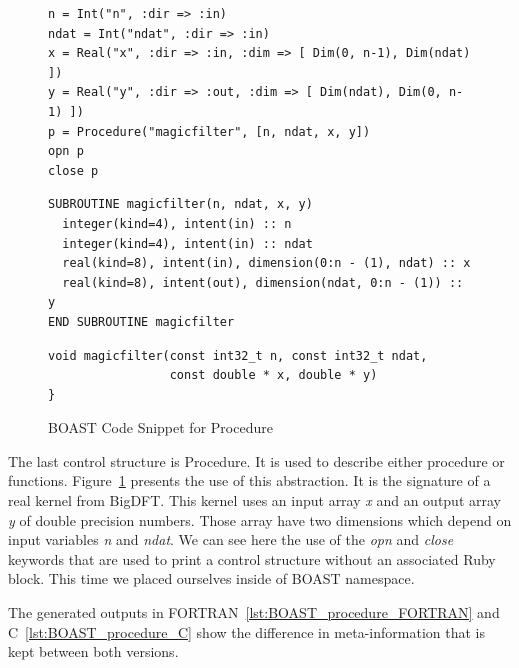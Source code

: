 \documentclass[11pt, a4paper, twoside]{montblanc}
\begin{document}
\begin{figure}
\begin{lstlisting}
n = Int("n", :dir => :in)
ndat = Int("ndat", :dir => :in)
x = Real("x", :dir => :in, :dim => [ Dim(0, n-1), Dim(ndat) ])
y = Real("y", :dir => :out, :dim => [ Dim(ndat), Dim(0, n-1) ])
p = Procedure("magicfilter", [n, ndat, x, y])
opn p
close p
\end{lstlisting}


\begin{lstlisting}
SUBROUTINE magicfilter(n, ndat, x, y)
  integer(kind=4), intent(in) :: n
  integer(kind=4), intent(in) :: ndat
  real(kind=8), intent(in), dimension(0:n - (1), ndat) :: x
  real(kind=8), intent(out), dimension(ndat, 0:n - (1)) :: y
END SUBROUTINE magicfilter
\end{lstlisting}

\begin{lstlisting}
void magicfilter(const int32_t n, const int32_t ndat,
                 const double * x, double * y)
}
\end{lstlisting}
\caption{BOAST Code Snippet for Procedure}
\label{fig:BOAST_procedure}
\end{figure}

The last control structure is Procedure. It is used to describe either procedure
or functions. Figure~\ref{fig:BOAST_procedure} presents the use of this
abstraction. It is the signature of a real kernel from BigDFT. This kernel uses
an input array \emph{x} and an output array \emph{y} of double precision
numbers. Those array have two dimensions which depend on input variables
\emph{n} and \emph{ndat}. We can see here the use of the \emph{opn} and
\emph{close} keywords that are used to print a control structure without an
associated Ruby block. This time we placed ourselves inside of BOAST namespace.

The generated outputs in FORTRAN~\ref{lst:BOAST_procedure_FORTRAN} and
C~\ref{lst:BOAST_procedure_C} show the difference in meta-information that is
kept between both versions.
  
\end{document}
